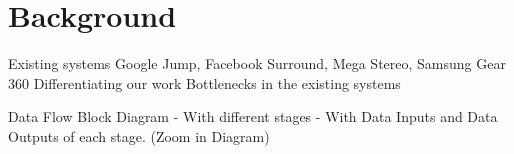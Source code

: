 \chapter{Background}
Existing systems \newline
Google Jump, Facebook Surround, Mega Stereo, Samsung Gear 360 \newline
Differentiating our work \newline
Bottlenecks in the existing systems \newline

Data Flow \newline
Block Diagram
- With different stages
- With Data Inputs and Data Outputs of each stage. (Zoom in Diagram)